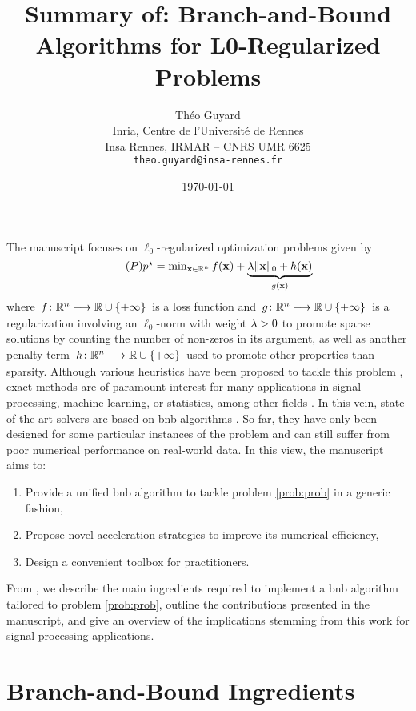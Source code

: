 \documentclass[11pt]{article}
\title{Summary of: Branch-and-Bound Algorithms for L0-Regularized Problems}
\author{Théo Guyard \\ Inria, Centre de l'Université de Rennes \\ Insa Rennes, IRMAR -- CNRS UMR 6625 \\ \texttt{theo.guyard@insa-rennes.fr}}
\date{\today}
\begin{document}
 

\maketitle

The manuscript focuses on $\ell_0$-regularized optimization problems given by
\begin{equation}
    \label{prob:prob}
    \tag{$\ppb$}
    \textstyle
    \opt{\pobj} = \min_{\pv \in \kR^{\pdim}} \lfunc(\pv) + \underbrace{\reg\norm{\pv}{0} + \pfunc(\pv)}_{\rfunc(\pv)}
\end{equation}
where $\kfuncdef{\lfunc}{\kR^{\pdim}}{\kR \cup \{+\infty\}}$ is a loss function and $\kfuncdef{\rfunc}{\kR^{\pdim}}{\kR \cup \{+\infty\}}$ is a regularization involving an $\ell_0$-norm with weight $\lambda > 0$ to promote sparse solutions by counting the number of non-zeros in its argument, as well as another penalty term $\kfuncdef{\pfunc}{\kR^{\pdim}}{\kR \cup \{+\infty\}}$ used to promote other properties than sparsity.
Although various heuristics have been proposed to tackle this problem \cite{tropp2010computational}, exact methods are of paramount interest for many applications in signal processing, machine learning, or statistics, among other fields \citep{tillmann2021cardinality,bertsimas2016best}.
In this vein, state-of-the-art solvers are based on \gls{bnb} algorithms \citep{ben2022global,hazimeh2022sparse}.
So far, they have only been designed for some particular instances of the problem and can still suffer from poor numerical performance on real-world data.
In this view, the manuscript aims to:
\begin{enumerate}[nosep, label=\arabic*.]
    \item Provide a unified \gls{bnb} algorithm to tackle problem \eqref{prob:prob} in a generic fashion,
    \item Propose novel acceleration strategies to improve its numerical efficiency,
    \item Design a convenient toolbox for practitioners.
\end{enumerate} 
From , we describe the main ingredients required to implement a \gls{bnb} algorithm tailored to problem \eqref{prob:prob}, outline the contributions presented in the manuscript, and give an overview of the implications stemming from this work for signal processing applications.


\section{Branch-and-Bound Ingredients}
\label{sec:bnb}
\end{document}
